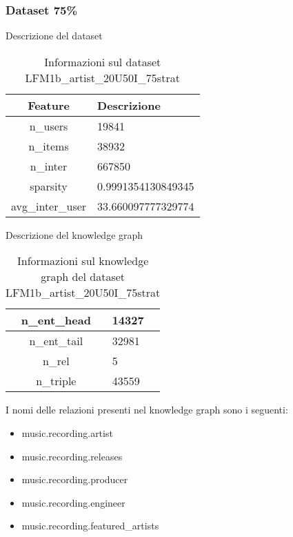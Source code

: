 \subsubsection{Dataset 75\%}

Descrizione del dataset
\begin{table}[H]
    \centering
    \footnotesize
    \begin{tabularx}{\textwidth}{|c|X|}
        \hline
        \textbf{Feature} & \textbf{Descrizione} \\
        \hline
        n\_users & 19841 \\
        \hline
        n\_items & 38932 \\
        \hline
        n\_inter & 667850 \\
        \hline
        sparsity & 0.9991354130849345 \\
        \hline
        avg\_inter\_user & 33.660097777329774 \\
        \hline
    \end{tabularx}
    \caption{Informazioni sul dataset LFM1b\_artist\_20U50I\_75strat}
    \label{tab:dataset_info}
\end{table}


\noindent Descrizione del knowledge graph
\begin{table}[H]
    \centering
    \footnotesize
    \begin{tabularx}{\textwidth}{|c|X|}
        \hline
        n\_ent\_head & 14327 \\
        \hline
        n\_ent\_tail & 32981 \\
        \hline
        n\_rel & 5 \\
        \hline
        n\_triple & 43559 \\
        \hline
    \end{tabularx}
    \caption{Informazioni sul knowledge graph del dataset LFM1b\_artist\_20U50I\_75strat}
    \label{tab:dataset_info}
\end{table}

\noindent I nomi delle relazioni presenti nel knowledge graph sono i seguenti:
\begin{itemize}
    \item music.recording.artist
    \item music.recording.releases
    \item music.recording.producer
    \item music.recording.engineer
    \item music.recording.featured\_artists
\end{itemize}



